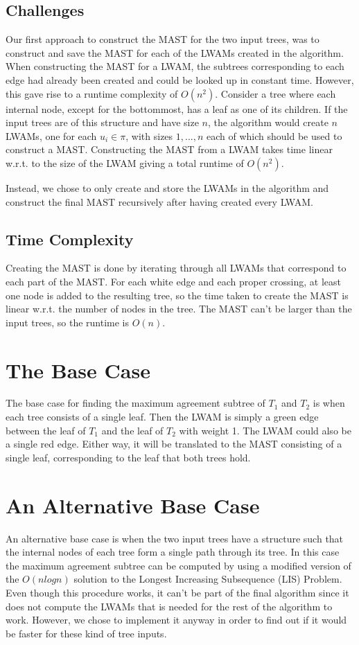 \subsection{Challenges} 
Our first approach to construct the MAST for the two input trees, was to construct and save the MAST for each of the LWAMs created in the algorithm. When constructing the MAST for a LWAM, the subtrees corresponding to each edge had already been created and could be looked up in constant time. However, this gave rise to a runtime complexity of $O(n^2)$. Consider a tree where each internal node, except for the bottommost, has a leaf as one of its children. If the input trees are of this structure and have size $n$, the algorithm would create $n$ LWAMs, one for each $u_i \in \pi$, with sizes $1, ..., n$ each of which should be used to construct a MAST. Constructing the MAST from a LWAM takes time linear w.r.t. to the size of the LWAM giving a total runtime of $O(n^2)$.

Instead, we chose to only create and store the LWAMs in the algorithm and construct the final MAST recursively after having created every LWAM.

\subsection{Time Complexity}
Creating the MAST is done by iterating through all LWAMs that correspond to each part of the MAST. For each white edge and each proper crossing, at least one node is added to the resulting tree, so the time taken to create the MAST is linear w.r.t. the number of nodes in the tree. The MAST can't be larger than the input trees, so the runtime is $O(n)$.

\section{The Base Case}
The base case for finding the maximum agreement subtree of $T_1$ and $T_2$ is when each tree consists of a single leaf. Then the LWAM is simply a green edge between the leaf of $T_1$ and the leaf of $T_2$ with weight 1. The LWAM could also be a single red edge. Either way, it will be translated to the MAST consisting of a single leaf, corresponding to the leaf that both trees hold.

\section{An Alternative Base Case}
An alternative base case is when the two input trees have a structure such that the internal nodes of each tree form a single path through its tree. In this case the maximum agreement subtree can be computed by using a modified version of the $O(nlogn)$ solution to the Longest Increasing Subsequence (LIS) Problem. Even though this procedure works, it can't be part of the final algorithm since it does not compute the LWAMs that is needed for the rest of the algorithm to work. However, we chose to implement it anyway in order to find out if it would be faster for these kind of tree inputs.

